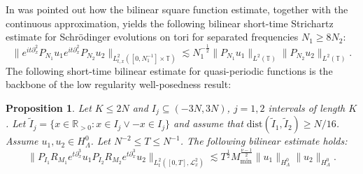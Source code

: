 \documentclass{amsart}
\newtheorem{proposition}[theorem]{Proposition}
\theoremstyle{definition}
\newcommand{\R}{\mathbb{R}}
\newcommand{\T}{\mathbb{T}}
\begin{document}
In \cite{Schippa2025Trilinear} was pointed out how the bilinear square function estimate, together with the continuous approximation, yields the following bilinear short-time Strichartz estimate for Schr\"odinger evolutions on tori for separated frequencies $N_1 \geq 8 N_2$:
\begin{equation*}
\| e^{it \partial_x^2} P_{N_1} u_1 e^{it \partial_x^2} P_{N_2} u_2 \|_{L^2_{t,x}([0,N_1^{-1}] \times \T)} \lesssim N_1^{-\frac{1}{2}} \| P_{N_1} u_1 \|_{L^2(\T)} \| P_{N_2} u_2 \|_{L^2(\T)}.
\end{equation*}
The following short-time bilinear estimate for quasi-periodic functions is the backbone of the low regularity well-posedness result:
\begin{proposition}
\label{prop:ShorttimeBilinearEstimateAiry}
Let $K \leq 2N$ and $I_j \subseteq (-3 N,3 N)$, $j=1,2$ intervals of length $K$. Let $\tilde{I}_j = \{ x \in \R_{>0} : x \in I_j \vee - x \in I_j \}$ and assume that $\text{dist}(\tilde{I}_1,\tilde{I}_2) \geq N/16$. Assume $u_1,u_2 \in H^0_\Lambda$. Let $N^{-2} \leq T \leq N^{-1}$. The following bilinear estimate holds:
\begin{equation}
\label{eq:BilinearStrichartzKdV}
\| P_{I_1} R_{M_1} e^{t \partial_x^3} u_1 P_{I_2} R_{M_2} e^{t \partial_x^3} u_2 \|_{L^2_t([0,T],\mathcal{L}^2_x)} \lesssim T^{\frac{1}{2}} M_{\min}^{\frac{\nu-1}{2}} \| u_1 \|_{H^0_\Lambda} \| u_2 \|_{H^0_\Lambda}.
\end{equation}
\end{proposition}
\end{document}

